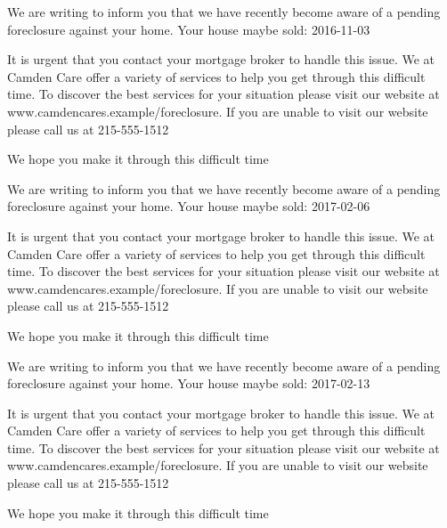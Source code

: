 \documentclass[10pt,stdletter]{newlfm}
\begin{document}
\pagebreak
{}
\begin{newlfm}

We are writing to inform you that we have recently become aware of a pending foreclosure against your home. Your house maybe sold: 2016-11-03

It is urgent that you contact your mortgage broker to handle this issue.
We at Camden Care offer a variety of services to help you get through this difficult time. To discover the best services for your situation please visit our website at www.camdencares.example/foreclosure.
If you are unable to visit our website please call us at 215-555-1512

We hope you make it through this difficult time

\end{newlfm}
\pagebreak
{}
\begin{newlfm}

We are writing to inform you that we have recently become aware of a pending foreclosure against your home. Your house maybe sold: 2017-02-06

It is urgent that you contact your mortgage broker to handle this issue.
We at Camden Care offer a variety of services to help you get through this difficult time. To discover the best services for your situation please visit our website at www.camdencares.example/foreclosure.
If you are unable to visit our website please call us at 215-555-1512

We hope you make it through this difficult time

\end{newlfm}
\pagebreak
{}
\begin{newlfm}

We are writing to inform you that we have recently become aware of a pending foreclosure against your home. Your house maybe sold: 2017-02-13

It is urgent that you contact your mortgage broker to handle this issue.
We at Camden Care offer a variety of services to help you get through this difficult time. To discover the best services for your situation please visit our website at www.camdencares.example/foreclosure.
If you are unable to visit our website please call us at 215-555-1512

We hope you make it through this difficult time

\end{newlfm}
\end{document}
